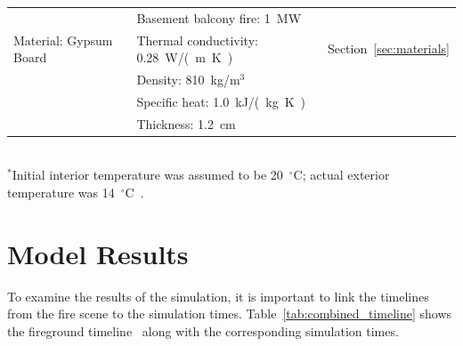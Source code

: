 \documentclass[12pt,oneside]{book}
\begin{document}
\begin{table}[!ht]
\begin{tabular}{lll}
                                                  &  Basement balcony fire: 1~MW                  &                                    \\
Material: Gypsum Board~\cite{WAKILI2007}          &  Thermal conductivity: 0.28~\si{W/(m.K)}      &  Section~\ref{sec:materials}       \\
                                                  &  Density: 810~kg/m$^3$                        &                                    \\
                                                  &  Specific heat: 1.0~\si{kJ/(kg.K)}            &                                    \\
                                                  &  Thickness: 1.2~\si{cm}                       &                                    \\
\bottomrule
\end{tabular}
\footnotesize
\\ $^{*}$Initial interior temperature was assumed to be 20~$^{\circ}$C; actual exterior temperature was 14~$^{\circ}$C~\cite{NIOSH:Bowyer2}.
\normalsize
\label{tab:model_parameters}
\end{table}


\chapter{Model Results}
\label{sec:model_results}

To examine the results of the simulation, it is important to link the timelines from the fire scene to the simulation times. Table~\ref{tab:combined_timeline} shows the fireground timeline~\cite{NIOSH:Bowyer2} along with the corresponding simulation times.
\end{document}
